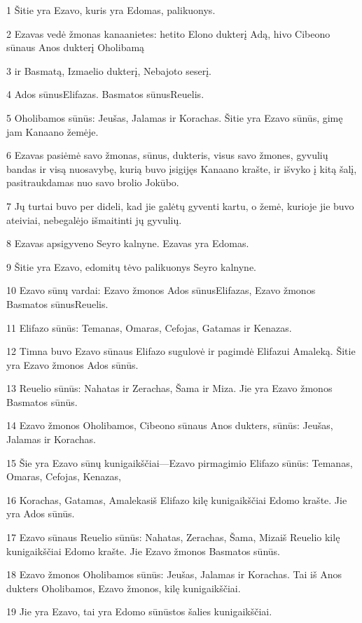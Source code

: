 \par 1 Šitie yra Ezavo, kuris yra Edomas, palikuonys. 
\par 2 Ezavas vedė žmonas kanaanietes: hetito Elono dukterį Adą, hivo Cibeono sūnaus Anos dukterį Oholibamą 
\par 3 ir Basmatą, Izmaelio dukterį, Nebajoto seserį. 
\par 4 Ados sūnus­Elifazas. Basmatos sūnus­Reuelis. 
\par 5 Oholibamos sūnūs: Jeušas, Jalamas ir Korachas. Šitie yra Ezavo sūnūs, gimę jam Kanaano žemėje. 
\par 6 Ezavas pasiėmė savo žmonas, sūnus, dukteris, visus savo žmones, gyvulių bandas ir visą nuosavybę, kurią buvo įsigijęs Kanaano krašte, ir išvyko į kitą šalį, pasitraukdamas nuo savo brolio Jokūbo. 
\par 7 Jų turtai buvo per dideli, kad jie galėtų gyventi kartu, o žemė, kurioje jie buvo ateiviai, nebegalėjo išmaitinti jų gyvulių. 
\par 8 Ezavas apsigyveno Seyro kalnyne. Ezavas yra Edomas. 
\par 9 Šitie yra Ezavo, edomitų tėvo palikuonys Seyro kalnyne. 
\par 10 Ezavo sūnų vardai: Ezavo žmonos Ados sūnus­Elifazas, Ezavo žmonos Basmatos sūnus­Reuelis. 
\par 11 Elifazo sūnūs: Temanas, Omaras, Cefojas, Gatamas ir Kenazas. 
\par 12 Timna buvo Ezavo sūnaus Elifazo sugulovė ir pagimdė Elifazui Amaleką. Šitie yra Ezavo žmonos Ados sūnūs. 
\par 13 Reuelio sūnūs: Nahatas ir Zerachas, Šama ir Miza. Jie yra Ezavo žmonos Basmatos sūnūs. 
\par 14 Ezavo žmonos Oholibamos, Cibeono sūnaus Anos dukters, sūnūs: Jeušas, Jalamas ir Korachas. 
\par 15 Šie yra Ezavo sūnų kunigaikščiai—Ezavo pirmagimio Elifazo sūnūs: Temanas, Omaras, Cefojas, Kenazas, 
\par 16 Korachas, Gatamas, Amalekas­iš Elifazo kilę kunigaikščiai Edomo krašte. Jie yra Ados sūnūs. 
\par 17 Ezavo sūnaus Reuelio sūnūs: Nahatas, Zerachas, Šama, Miza­iš Reuelio kilę kunigaikščiai Edomo krašte. Jie Ezavo žmonos Basmatos sūnūs. 
\par 18 Ezavo žmonos Oholibamos sūnūs: Jeušas, Jalamas ir Korachas. Tai iš Anos dukters Oholibamos, Ezavo žmonos, kilę kunigaikščiai. 
\par 19 Jie yra Ezavo, tai yra Edomo sūnūs­tos šalies kunigaikščiai. 

